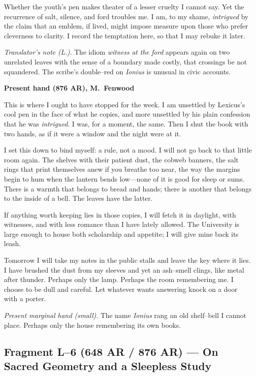 \documentclass[11pt]{article}
\numberwithin{equation}{section} %
\theoremstyle{plain} %
\theoremstyle{definition} %
\theoremstyle{remark} %
\begin{document}
Whether the youth's pen makes theater of a lesser cruelty I cannot say. Yet the recurrence of salt, silence, and ford troubles me. I am, to my shame, \emph{intrigued} by the claim that an emblem, if lived, might impose measure upon those who prefer cleverness to clarity. I record the temptation here, so that I may rebuke it later.

\medskip
\noindent\textit{Translator's note (L.).} The idiom \textit{witness at the ford} appears again on two unrelated leaves with the sense of a boundary made costly, that crossings be not squandered. The scribe's double--red on \emph{Ionius} is unusual in civic accounts.

\medskip
\noindent\textbf{Present hand (876 AR), M.\ Fenwood}

This is where I ought to have stopped for the week. I am unsettled by Lexicus's cool pen in the face of what he copies, and more unsettled by his plain confession that he was \emph{intrigued}. I was, for a moment, the same. Then I shut the book with two hands, as if it were a window and the night were at it.

I set this down to bind myself: a rule, not a mood. I will not go back to that little room again. The shelves with their patient dust, the cobweb banners, the salt rings that print themselves anew if you breathe too near, the way the margins begin to hum when the lantern bends low---none of it is good for sleep or sums. There is a warmth that belongs to bread and hands; there is another that belongs to the inside of a bell. The leaves have the latter.

If anything worth keeping lies in those copies, I will fetch it in daylight, with witnesses, and with less romance than I have lately allowed. The University is large enough to house both scholarship and appetite; I will give mine back its leash.

Tomorrow I will take my notes in the public stalls and leave the key where it lies. I have brushed the dust from my sleeves and yet an ash--smell clings, like metal after thunder. Perhaps only the lamp. Perhaps the room remembering me. I choose to be dull and careful. Let whatever wants answering knock on a door with a porter.

\medskip
\noindent\textit{Present marginal hand (small).} The name \emph{Ionius} rang an old shelf--bell I cannot place. Perhaps only the house remembering its own books.

\subsection{Fragment L--6 (648 AR / 876 AR) --- On Sacred Geometry and a Sleepless Study}
\label{frag:l6}
\end{document}
